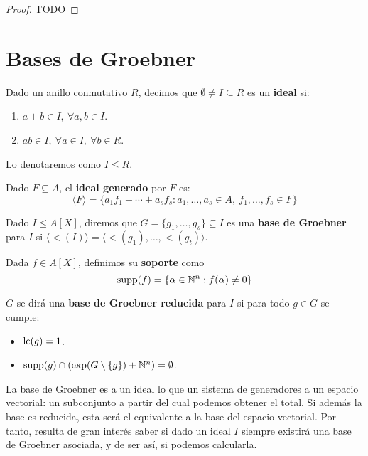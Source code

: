 \begin{proof}
    TODO
\end{proof}
\section{Bases de Groebner}

\begin{definicion}
    Dado un anillo conmutativo $R$, decimos que $\emptyset \neq I \subseteq R$ es un \textbf{ideal} si:
    \begin{enumerate}
        \item $a+b\in I,\ \forall a,b\in I$.
        \item $ab\in I,\ \forall a\in I,\ \forall b\in R$.
    \end{enumerate}

    Lo denotaremos como $I\le R$.
\end{definicion}

\begin{definicion}
    Dado $F\subseteq A$, el \textbf{ideal generado} por $F$ es:
    \begin{equation*}
        \langle F \rangle = \{a_1f_1 + \cdots + a_sf_s : a_1,\dots, a_s\in A,\ f_1,\dots, f_s\in F\}
    \end{equation*}
\end{definicion}

\begin{definicion}
    Dado $I\le A[X]$, diremos que $G = \{g_1,\dots, g_s\}\subseteq I$ es una \textbf{base de Groebner} para $I$ si $\langle \lt(I)\rangle = \langle \lt(g_1),\dots, \lt(g_t) \rangle$.
\end{definicion}

\begin{definicion}
    Dada $f\in A[X]$, definimos su \textbf{soporte} como $$\text{supp}(f) = \{ \alpha\in\mathbb{N}^n : f(\alpha) \neq 0\}$$
\end{definicion}

\begin{definicion}
    $G$ se dirá una \textbf{base de Groebner reducida} para $I$ si para todo $g\in G$ se cumple:
    \begin{itemize}
        \item $\text{lc}(g)=1$.
        \item $\text{supp}(g) \cap \left(\exp(G\setminus\{g\}) + \mathbb{N}^n \right) = \emptyset$.
    \end{itemize}
\end{definicion}

La base de Groebner es a un ideal lo que un sistema de generadores a un espacio vectorial: un subconjunto a partir del cual podemos obtener el total. Si además la base es reducida, esta será el equivalente a la base del espacio vectorial. Por tanto, resulta de gran interés saber si dado un ideal $I$ siempre existirá una base de Groebner asociada, y de ser así, si podemos calcularla.


